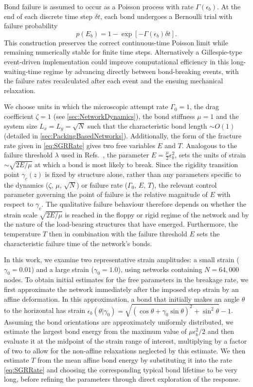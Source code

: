 Bond failure is assumed to occur as a Poisson process with rate $\Gamma(\epsilon_b)$. At the end of each discrete time step $\delta t$, each bond undergoes a Bernoulli trial with failure probability
\begin{equation*}
    p(E_b) = 1 - \exp\left[ -\Gamma(\epsilon_b)\delta t \right].
\end{equation*}
This construction preserves the correct continuous-time Poisson limit while remaining numerically stable for finite time steps. Alternatively a Gillespie-type event-driven implementation could improve computational efficiency in this long-waiting-time regime by advancing directly between bond-breaking events, with the failure rates recalculated after each event and the ensuing mechanical relaxation.

We choose units in which the microscopic attempt rate $\Gamma_0=1$, the drag coefficient $\zeta=1$ (see \cref{sec:NetworkDynamics}), the bond stiffness $\mu=1$ and the system size $L_x=L_y=\sqrt{N}$ such that the characteristic bond length $\sim O(1)$ (detailed in \cref{sec:PackingBasedNetworks}). Additionally, the form of the fracture rate given in \cref{eq:SGRRate} gives two free variables $E$ and $T$. Analogous to the failure threshold $\lambda$ used in Refs.~\cite{tauber_role_2020,tauber_sharing_2021,tauber_microscopic_2020}, the parameter $E=\frac{\mu}{2}\epsilon_b^2$, sets the units of strain $ \sim \sqrt{2E / \mu}$ at which a bond is most likely to break. Since the rigidity transition point $\gamma_c(z)$ is fixed by structure alone, rather than any parameters specific to the dynamics ($\zeta$, $\mu$, $\sqrt{N}$) or failure rate ($\Gamma_0$, $E$, $T$), the relevant control parameter governing the point of failure is the relative magnitude of $E$ with respect to $\gamma_c$. The qualitative failure behaviour therefore depends on whether the strain scale $\sqrt{2E / \mu}$ is reached in the floppy or rigid regime of the network and by the nature of the load-bearing structures that have emerged. Furthermore, the temperature $T$ then in combination with the failure threshold $E$ sets the characteristic failure time of the network's bonds.

In this work, we examine two representative strain amplitudes: a small strain ($\gamma_0=0.01$) and a large strain ($\gamma_0=1.0$), using networks containing $N=64{,}000$ nodes. To obtain initial estimates for the free parameters in the breakage rate, we first approximate the network immediately after the imposed step strain by an affine deformation. In this approximation, a bond that initially makes an angle $\theta$ to the horizontal has strain $\epsilon_b(\theta|\gamma_0)=\sqrt{(\cos\theta+\gamma_0\sin\theta)^2+\sin^2\theta}-1$. Assuming the bond orientations are approximately uniformly distributed, we estimate the largest bond energy from the maximum value of $\mu\epsilon_b^2/2$ and then evaluate it at the midpoint of the strain range of interest, multiplying by a factor of two to allow for the non-affine relaxations neglected by this estimate. We then estimate $T$ from the mean affine bond energy by substituting it into the rate \cref{eq:SGRRate} and choosing the corresponding typical bond lifetime to be very long, before refining the parameters through direct exploration of the response. 

